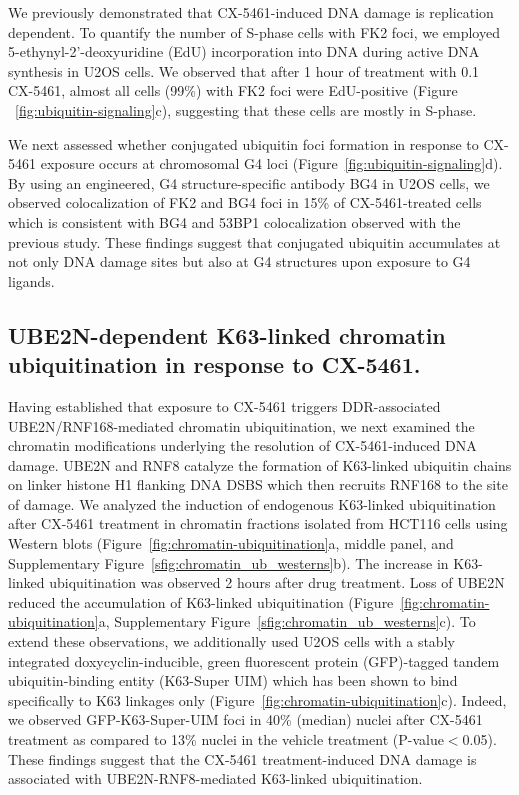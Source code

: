 We previously demonstrated that CX-5461-induced DNA damage is replication dependent\cite{Xu2017}. 
To quantify the number of S-phase cells with FK2 foci, we employed 5-ethynyl-2'-deoxyuridine (EdU) incorporation into DNA during active DNA synthesis in U2OS cells. 
We observed that after 1 hour of treatment with \SI{0,1}{\micro\Molar} CX-5461, almost all cells (99\%) with FK2 foci were EdU-positive (Figure ~\ref{fig:ubiquitin-signaling}c), suggesting that these cells are mostly in S-phase.

We next assessed whether conjugated ubiquitin foci formation in response to CX-5461 exposure occurs at chromosomal G4 loci (Figure~\ref{fig:ubiquitin-signaling}d). 
By using an engineered, G4 structure-specific antibody BG4\cite{Biffi2013b} in U2OS cells, we observed colocalization of FK2 and BG4 foci in 15\% of CX-5461-treated cells which is consistent with BG4 and 53BP1 colocalization observed with the previous study\cite{Xu2017}. 
These findings suggest that conjugated ubiquitin accumulates at not only DNA damage sites but also at G4 structures upon exposure to G4 ligands.   

\subsection{UBE2N-dependent K63-linked chromatin ubiquitination in response to CX-5461.}
Having established that exposure to CX-5461 triggers DDR-associated UBE2N/RNF168-mediated chromatin ubiquitination, we next examined the chromatin modifications underlying the resolution of CX-5461-induced DNA damage. 
UBE2N and RNF8 catalyze the formation of K63-linked ubiquitin chains on linker histone H1 flanking DNA DSBS which then recruits RNF168 to the site of damage\cite{Thorslund2015}. 
We analyzed the induction of endogenous K63-linked ubiquitination after CX-5461 treatment in chromatin fractions isolated from HCT116 cells using Western blots (Figure~\ref{fig:chromatin-ubiquitination}a, middle panel, and Supplementary Figure~\ref{sfig:chromatin_ub_westerns}b). 
The increase in K63-linked ubiquitination was observed 2 hours after drug treatment. 
Loss of UBE2N reduced the accumulation of K63-linked ubiquitination (Figure~\ref{fig:chromatin-ubiquitination}a, Supplementary Figure~\ref{sfig:chromatin_ub_westerns}c). 
To extend these observations, we additionally used U2OS cells with a stably integrated doxycyclin-inducible, green fluorescent protein (GFP)-tagged tandem ubiquitin-binding entity (K63-Super UIM) which has been shown to bind specifically to K63 linkages only\cite{Thorslund2015} (Figure~\ref{fig:chromatin-ubiquitination}c). 
Indeed, we observed GFP-K63-Super-UIM foci in 40\% (median) nuclei after CX-5461 treatment as compared to 13\% nuclei in the vehicle treatment (P-value$<$0.05). 
These findings suggest that the CX-5461 treatment-induced DNA damage is associated with UBE2N-RNF8-mediated K63-linked ubiquitination. 


